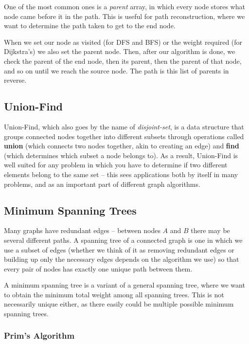 One of the most common ones is a \textit{parent} array, in which every node stores what node came before it in the path. This is useful for path reconstruction, where we want to determine the path taken to get to the end node.

When we set our node as visited (for DFS and BFS) or the weight required (for Dijkstra's) we also set the parent node. Then, after our algorithm is done, we check the parent of the end node, then its parent, then the parent of that node, and so on until we reach the source node. The path is this list of parents in reverse.

\subsection{Union-Find}
  

Union-Find, which also goes by the name of \textit{disjoint-set}, is a data structure that groups connected nodes together into different subsets through operations called \textbf{union} (which connects two nodes together, akin to creating an edge) and \textbf{find} (which determines which subset a node belongs to). As a result, Union-Find is well suited for any problem in which you have to determine if two different elements belong to the same set -- this sees applications both by itself in many problems, and as an important part of different graph algorithms.

\subsection{Minimum Spanning Trees}
 

Many graphs have redundant edges -- between nodes $A$ and $B$ there may be several different paths. A spanning tree of a connected graph is one in which we use a subset of edges (whether we think of it as removing redundant edges or building up only the necessary edges depends on the algorithm we use) so that every pair of nodes has exactly one unique path between them.

A minimum spanning tree is a variant of a general spanning tree, where we want to obtain the minimum total weight among all spanning trees. This is not necessarily unique either, as there easily could be multiple possible minimum spanning trees.

\subsubsection{Prim's Algorithm}

